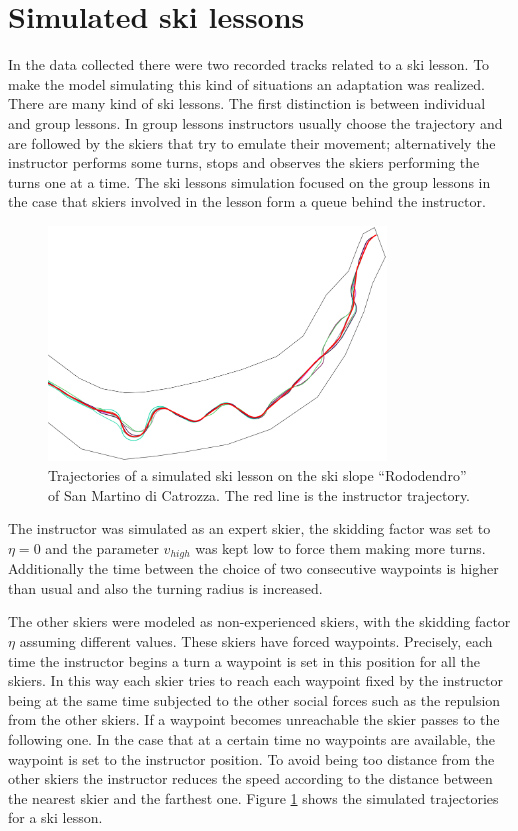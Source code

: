 \documentclass[12pt,a4paper,twoside]{book}
\begin{document}
\section{Simulated ski lessons}\label{ski_lessons}
In the data collected there were two recorded tracks related to a ski lesson. To make the model simulating this kind of situations an adaptation was realized. There are many kind of ski lessons. The first distinction is between individual and group lessons. In group lessons instructors usually choose the trajectory and are followed by the skiers that try to emulate their movement; alternatively the instructor performs some turns, stops and observes the skiers performing the turns one at a time. The ski lessons simulation focused on the group lessons in the case that skiers involved in the lesson form a queue behind the instructor.

\begin{figure}[!b]
  \centering
    \includegraphics[width=0.8\textwidth]{images/lesson.eps}
    \caption{Trajectories of a simulated ski lesson on the ski slope ``Rododendro'' of San Martino di Catrozza. The red line is the instructor trajectory.}\label{lesson}
\end{figure}

The instructor was simulated as an expert skier, the skidding factor was set to $\eta=0$ and the parameter ${v_{high}}$ was kept low to force them making more turns. Additionally the time between the choice of two consecutive waypoints is higher than usual and also the turning radius is increased.

The other skiers were modeled as non-experienced skiers, with the skidding factor $\eta$ assuming different values. These skiers have forced waypoints. Precisely, each time the instructor begins a turn a waypoint is set in this position for all the skiers. In this way each skier tries to reach each waypoint fixed by the instructor being at the same time subjected to the other social forces such as the repulsion from the other skiers. If a waypoint becomes unreachable the skier passes to the following one. In the case that at a certain time no waypoints are available, the waypoint is set to the instructor position. To avoid being too distance from the other skiers the instructor reduces the speed according to the distance between the nearest skier and the farthest one. Figure \ref{lesson} shows the simulated trajectories for a ski lesson.
\end{document}
